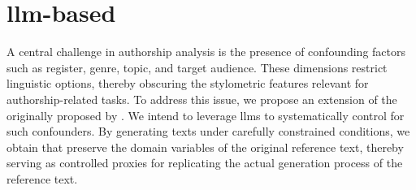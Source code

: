 \chapter{\acs{llm}-based \impAppr{}}
\label{chap:llm_impostor_method}

A central challenge in authorship analysis is the presence of confounding factors such as register, genre, topic, and target audience. 
These dimensions restrict linguistic options, thereby obscuring the stylometric features relevant for authorship-related tasks. 
To address this issue, we propose an extension of the \impAppr{} originally proposed by \citet{koppel_determining_2014}.
We intend to leverage \acp{llm} to systematically control for such confounders. 
By generating texts under carefully constrained conditions, we obtain \imps{} that preserve the domain variables of the original reference text, thereby serving as controlled proxies for replicating the actual generation process of the reference text.






